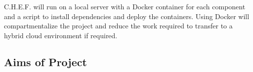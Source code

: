 \documentclass[../CHEFCookingHelperForEveryonesFridge.tex]{subfiles}
\newcommand{\chef}{C.H.E.F.}
\begin{document}
\chef{} will run on a local server with a Docker container for each component and a script to install dependencies and deploy the containers.
Using Docker will compartmentalize the project and reduce the work required to transfer to a hybrid cloud environment if required.

\subsection{Aims of Project}
\end{document}
